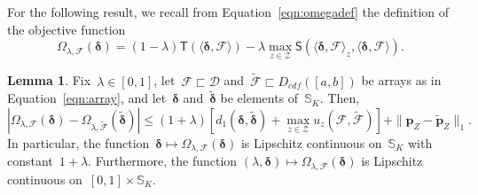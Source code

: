 \documentclass[11pt, a4paper]{article}
\theoremstyle{definition}
\newtheorem{lemma}[theorem]{Lemma}
\begin{document}
For the following result, we recall from Equation~\eqref{eqn:omegadef} the definition of the objective function
\begin{equation*}
\Omega_{\lambda, \mathcal{F}}(\bm{\delta}) = (1-\lambda) \mathsf{T}\left( \langle \bm{\delta}, \mathcal{F} \rangle \right) - \lambda \max_{z \in \mathcal{Z}} \mathsf{S} \left(\langle \bm{\delta}, \mathcal{F} \rangle_z , \langle \bm{\delta}, \mathcal{F} \rangle \right).
\end{equation*} 

\begin{lemma}\label{lem:exmax}
Fix~$\lambda \in [0, 1]$, let~$\mathcal{F} \sqsubset \mathscr{D}$ and~$\tilde{\mathcal{F}}  \sqsubset D_{cdf}([a,b])$ be arrays as in Equation~\eqref{eqn:array}, and let~$\bm{\delta}$ and~$\tilde{\bm{\delta}}$ be elements of~$\mathbb{S}_K$. Then, 
\begin{equation}\label{eqn:uplem1}
\left|\Omega_{\lambda, \mathcal{F}}(\bm{\delta}) - \Omega_{\lambda, \tilde{\mathcal{F}}}(\tilde{\bm{\delta}})\right| \leq  (1+\lambda) \left[ d_1(\bm{\delta}, \tilde{\bm{\delta}}) + \max_{z \in \mathcal{Z}} u_z(\mathcal{F}, \tilde{\mathcal{F}})\right] + \|\bm{p}_Z - \tilde{\bm{p}}_Z\|_1.
\end{equation}
%
In particular, the function~$\bm{\delta} \mapsto \Omega_{\lambda, \mathcal{F}}(\bm{\delta})$ is Lipschitz continuous on~$\mathbb{S}_K$ with constant~$1+\lambda$. Furthermore, the function $(\lambda, \bm{\delta}) \mapsto \Omega_{\lambda, \mathcal{F}}(\bm{\delta})$ is Lipschitz continuous on~$[0, 1] \times \mathbb{S}_K$.
\end{lemma}
\end{document}
